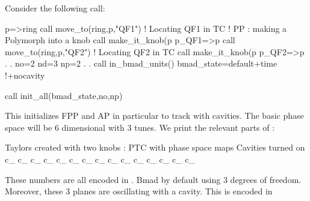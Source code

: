 \documentclass{hitec}     %
\begin{document}
{{{{{ Consider the following call:
 
\begin{code}
p=>ring%
call move_to(ring,p,"QF1")   !  Locating QF1 in TC
!  PP : making a Polymorph into a knob
call make_it_knob(p%
p_QF1=>p
call move_to(ring,p,"QF2")   ! Locating QF2 in TC
call make_it_knob(p%
p_QF2=>p
	.
	.
no=2
nd=3
np=2
	.
	.
call in_bmad_units()
bmad_state=default+time      !+nocavity

call init_all(bmad_state,no,np)
\end{code}
 
 This initializes FPP and AP in particular to track with cavities. The basic phase space will be 6 dimensional with 3 tunes. We print the relevant parts of :
 
 \begin{code}
  Taylors created with two knobs : PTC with phase space maps
 Cavities turned on
        c_%
        c_%
        c_%
       c_%
   c_%
      c_%
 c_%
        c_%
  c_%
       c_%
      c_%
 c_%
         c_%
    c_%
       c_%
 \end{code}

 These numbers are all encoded in . Bmad by default using 3 degrees of freedom. Moreover, these 3 planes are oscillating with a cavity. This is encoded in \vn{c_%
 Notice that there are 8 variables total: 2 quadrupole strengths at location \newline
   \vn{c_%
 
 Before we go into a detailed explanations of type \vn{c_damap}, we show a more complex call to \vn{init_all}. We run PTC with the \vn{internal_state}  
 \begin{code}
 	.
 	.
 call in_bmad_units()
!call in_ptc_units()
bmad_state=default+time0+nocavity0
bmad_state=bmad_state+modulation0+spin0
 	.
 	.
  \end{code}
  and then we get:  
 \begin{code}
 Taylors created with 2 knobs : PTC with phase space maps
  without a cavity and modulation on a magnet
        c_%
        c_%
        c_%
       c_%
   c_%
      c_%
 c_%
        c_%
  c_%
       c_%
      c_%
 c_%
         c_%
    c_%
       c_%
 \end{code}
 
}}}}}}}
\end{document}
